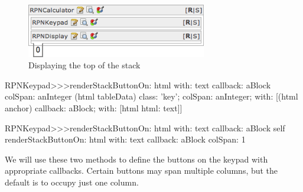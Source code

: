 \documentclass[a4paper,10pt,twoside]{book}
\begin{document}
\begin{figure}[ht]
\begin{center}
\includegraphics[width=0.7\textwidth]{firstStackDisplay}
\caption{Displaying the top of the stack}
\label{fig:firstStackDisplay}
\end{center}
\end{figure}


\begin{code}{}
RPNKeypad>>>renderStackButtonOn: html with: text callback: aBlock colSpan: anInteger 
	(html tableData)
		class: 'key';
		colSpan: anInteger;
		with: 
				[(html anchor)
					callback: aBlock;
					with: [html html: text]]
\end{code}


\begin{code}{}
RPNKeypad>>>renderStackButtonOn: html with: text callback: aBlock 
	self 
		renderStackButtonOn: html
		with: text
		callback: aBlock
		colSpan: 1
\end{code}

We will use these two methods to define the buttons on the keypad with appropriate callbacks.
Certain buttons may span multiple columns, but the default is to occupy just one column.

\end{document}
